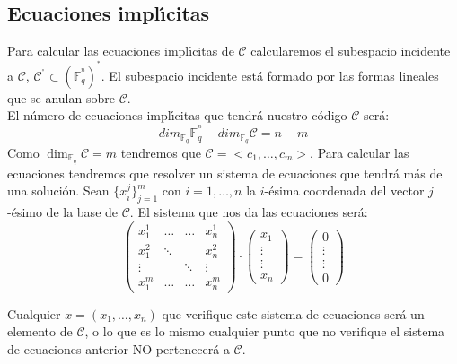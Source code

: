 \subsection{Ecuaciones impl\'{\i}citas}\label{sec:EcuImplicitas}

Para calcular las ecuaciones impl\'{\i}citas de $\mathcal{C}$ calcularemos el
subespacio incidente a $\mathcal{C}$, $\mathcal{C}^{^{\circ}}\subset
(\mathbb{F}^{^n}_q)^{^*}$. El subespacio incidente est\'a formado por las
formas lineales que se anulan sobre $\mathcal{C}$.\\

El n\'umero de ecuaciones impl\'{\i}citas que tendr\'a nuestro c\'odigo
$\mathcal{C}$ ser\'a:
$$dim_{\mathbb{F}_q} \mathbb{F}^{^n}_q - dim_{\mathbb{F}_q} \mathcal{C}=n-m$$
Como $\dim_{\mathbb{F}_q} \mathcal{C} = m$ tendremos que
$\mathcal{C}=<c_1,\ldots,c_m>$. Para calcular las ecuaciones tendremos que
resolver un sistema de ecuaciones que tendr\'a m\'as de una soluci\'on.
%
\newpage
%
Sean $\{x_i^j\}_{j=1}^m$ con $i=1,\dots,n$ la $i$-\'esima coordenada del
vector $j$-\'esimo de la base de $\mathcal{C}$. El sistema que nos da las
ecuaciones ser\'a:
\begin{displaymath}
\left( \begin{array}{cccc}
x_1^1 & \ldots & \ldots & x_n^1 \\
x_1^2 & \ddots & & x_n^2 \\
\vdots & &\ddots & \vdots \\
x_1^m &\ldots &\ldots & x_n^m
\end{array} \right) \cdot
\left( \begin{array}{c}
x_1 \\
\vdots \\
\vdots \\
x_n
\end{array} \right) =
\left( \begin{array}{c}
0 \\
\vdots \\
\vdots \\
0
\end{array} \right)
\end{displaymath}

Cualquier $x=(x_1,\ldots,x_n)$ que verifique este sistema de ecuaciones
ser\'a un elemento de $\mathcal{C}$, o lo que es lo mismo cualquier punto que no
verifique el sistema de ecuaciones anterior NO pertenecer\'a a $\mathcal{C}$.

